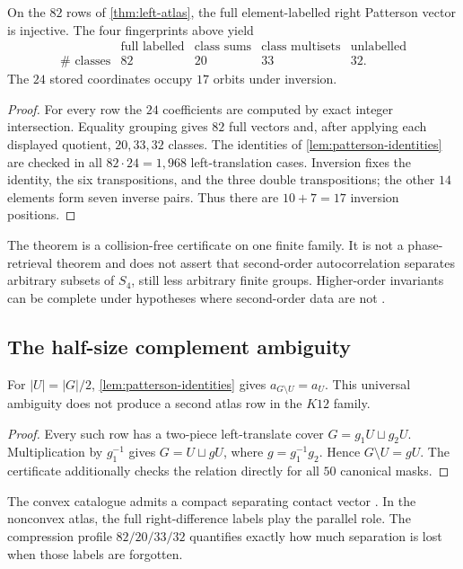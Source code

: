 \begin{theorem}\label{thm:patterson}
On the $82$ rows of \cref{thm:left-atlas}, the full element-labelled right
Patterson vector is injective.  The four fingerprints above yield
\[
\begin{array}{c|cccc}
&\text{full labelled}&\text{class sums}&\text{class multisets}&
\text{unlabelled}\\ \hline
\#\text{ classes}&82&20&33&32.
\end{array}
\]
The $24$ stored coordinates occupy $17$ orbits under inversion.
\end{theorem}
\begin{proof}
For every row the $24$ coefficients are computed by exact integer
intersection.  Equality grouping gives $82$ full vectors and, after applying
each displayed quotient, $20,33,32$ classes.  The identities of
\cref{lem:patterson-identities} are checked in all $82\cdot24=1{,}968$
left-translation cases.  Inversion fixes the identity, the six
transpositions, and the three double transpositions; the other $14$ elements
form seven inverse pairs.  Thus there are $10+7=17$ inversion positions.
\end{proof}

\begin{remark}[Scope]
The theorem is a collision-free certificate on one finite family.  It is not
a phase-retrieval theorem and does not assert that second-order
autocorrelation separates arbitrary subsets of $S_4$, still less arbitrary
finite groups.  Higher-order invariants can be complete under hypotheses
where second-order data are not \cite{Kakarala2012,RadcliffeScott2007}.
\end{remark}

\subsection{The half-size complement ambiguity}

For $|U|=|G|/2$, \cref{lem:patterson-identities} gives
$a_{G\setminus U}=a_U$.  This universal ambiguity does not produce a second
atlas row in the $K12$ family.

\begin{proof}
Every such row has a two-piece left-translate cover
$G=g_1U\sqcup g_2U$.  Multiplication by $g_1^{-1}$ gives
$G=U\sqcup gU$, where $g=g_1^{-1}g_2$.  Hence $G\setminus U=gU$.
The certificate additionally checks the relation directly for all $50$
canonical masks.
\end{proof}

The convex catalogue admits a compact separating contact vector
\cite{BabanskyyT2}.  In the nonconvex atlas, the full right-difference labels
play the parallel role.  The compression profile $82/20/33/32$ quantifies
exactly how much separation is lost when those labels are forgotten.
